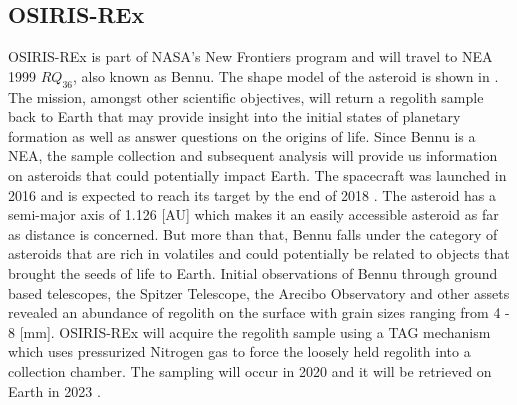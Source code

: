 \subsection{OSIRIS-REx}
\label{subsec:osiris_heritage}
\gls{OSIRIS-REx} is part of \gls{NASA}'s New Frontiers program and will travel to \gls{NEA} 1999 $RQ_{36}$, also known as Bennu. The shape model of the asteroid is shown in  \parencite{bennuShapeModel}. The mission, amongst other scientific objectives, will return a regolith sample back to Earth that may provide insight into the initial states of planetary formation as well as answer questions on the origins of life. Since Bennu is a \gls{NEA}, the sample collection and subsequent analysis will provide us information on asteroids that could potentially impact Earth. The spacecraft was launched in 2016 and is expected to reach its target by the end of 2018 \parencite{berry2013osiris}. The asteroid has a semi-major axis of 1.126 [AU] which makes it an easily accessible asteroid as far as distance is concerned. But more than that, Bennu falls under the category of asteroids that are rich in volatiles and could potentially be related to objects that brought the seeds of life to Earth. Initial observations of Bennu through ground based telescopes, the Spitzer Telescope, the Arecibo Observatory and other assets revealed an abundance of regolith on the surface with grain sizes ranging from 4 - 8 [mm]. \gls{OSIRIS-REx} will acquire the regolith sample using a \gls{TAG} mechanism which uses pressurized Nitrogen gas to force the loosely held regolith into a collection chamber. The sampling will occur in 2020 and it will be retrieved on Earth in 2023 \parencite{osirisMissionOverview}.
